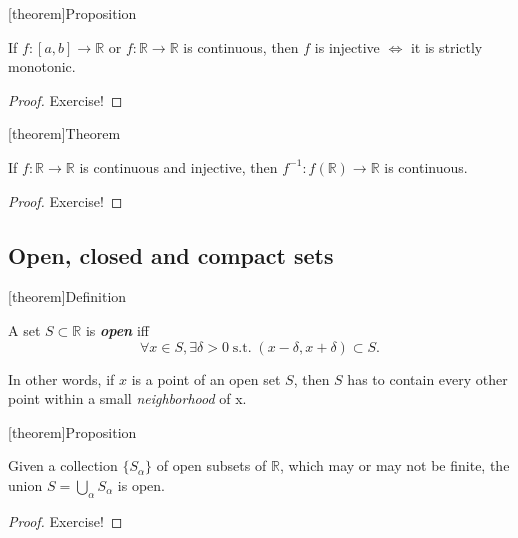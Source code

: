 \documentclass[12pt]{report}
\theoremstyle{definition}
\begin{document}
[theorem]{Proposition}
\begin{one-to-one continuous map}
    If $f:[a,b]\rightarrow\mathbb{R}$ or $f:\mathbb{R}\rightarrow\mathbb{R}$ is
    continuous, then $f$ is injective $\iff$
    it is strictly monotonic.
\end{one-to-one continuous map}

\begin{proof}
    Exercise!
\end{proof} 

[theorem]{Theorem}
\begin{continuous and injective f from R to R}
    If $f:\mathbb{R}\rightarrow\mathbb{R}$ is continuous and injective, then
    $f^{-1}:f(\mathbb{R})\rightarrow\mathbb{R}$ is continuous.
\end{continuous and injective f from R to R}

\begin{proof}
    Exercise!
\end{proof} 


\subsection{Open, closed and compact sets}\label{sec:open_closed_compact_sets}

[theorem]{Definition}
\begin{open set}
    A set $S\subset\mathbb{R}$ is \textbf{\emph{open}} iff \[
        \forall x \in S, \exists \delta > 0 \;\text{s.t.}\; 
        (x-\delta, x+\delta) \subset S.
    \]
\end{open set}
In other words, if $x$ is a point of an open set $S$, then $S$ has to contain
every other point within a small \emph{neighborhood} of x.

[theorem]{Proposition}
\begin{union of open sets are open}\label{prop:2}
    Given a collection $\{S_\alpha\}$ of open subsets of $\mathbb{R}$,
    which may or may not be finite,
    the union $S = \bigcup_\alpha S_\alpha$ is open.
\end{union of open sets are open}

\begin{proof}
    Exercise!
\end{proof} 
\end{document}
